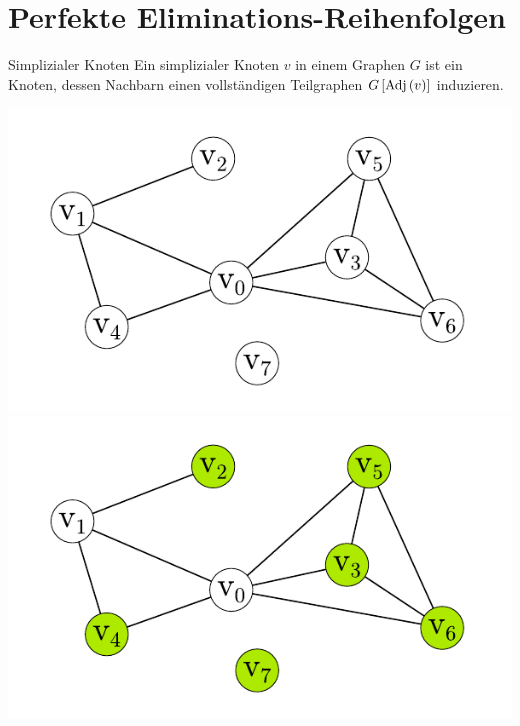 \documentclass[xcolor=x11names,compress]{beamer}
\begin{document}
\section{Perfekte Eliminations-Reihenfolgen}
\begin{frame}
	\begin{block}{Simplizialer Knoten}
		Ein simplizialer Knoten \( v \) in einem Graphen \( G \) ist ein Knoten, dessen Nachbarn einen vollständigen Teilgraphen \( G \left[\textnormal{Adj} \left( v \right) \right] \) induzieren.
	\end{block}
	\begin{overprint}
		\includegraphics[scale=1.0]{img/graph/chordalsimple.pdf}
		\onslide<2>\includegraphics[scale=1.0]{img/graph/simplizial.pdf}
	\end{overprint}
\end{frame}
\end{document}
